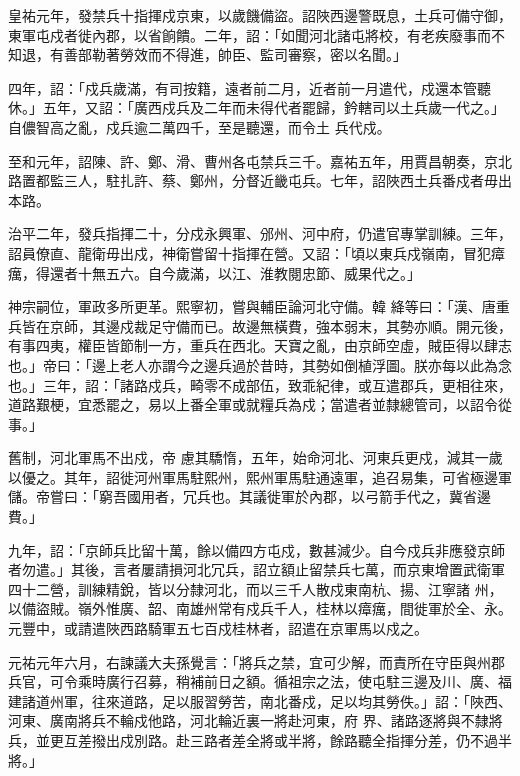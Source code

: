 \begin{pinyinscope}
 皇祐元年，發禁兵十指揮戍京東，以歲饑備盜。詔陜西邊警既息，土兵可備守御，東軍屯戍者徙內郡，以省餉饋。二年，詔：「如聞河北諸屯將校，有老疾廢事而不知退，有善部勒著勞效而不得進，帥臣、監司審察，密以名聞。」



 四年，詔：「戍兵歲滿，有司按籍，遠者前二月，近者前一月遣代，戍還本管聽休。」五年，又詔：「廣西戍兵及二年而未得代者罷歸，鈐轄司以土兵歲一代之。」自儂智高之亂，戍兵逾二萬四千，至是聽還，而令土
 兵代戍。



 至和元年，詔陳、許、鄭、滑、曹州各屯禁兵三千。嘉祐五年，用賈昌朝奏，京北路置都監三人，駐扎許、蔡、鄭州，分督近畿屯兵。七年，詔陜西土兵番戍者毋出本路。



 治平二年，發兵指揮二十，分戍永興軍、邠州、河中府，仍遣官專掌訓練。三年，詔員僚直、龍衛毋出戍，神衛嘗留十指揮在營。又詔：「頃以東兵戍嶺南，冒犯瘴癘，得還者十無五六。自今歲滿，以江、淮教閱忠節、威果代之。」



 神宗嗣位，軍政多所更革。熙寧初，嘗與輔臣論河北守備。韓
 絳等曰：「漢、唐重兵皆在京師，其邊戍裁足守備而已。故邊無橫費，強本弱末，其勢亦順。開元後，有事四夷，權臣皆節制一方，重兵在西北。天寶之亂，由京師空虛，賊臣得以肆志也。」帝曰：「邊上老人亦謂今之邊兵過於昔時，其勢如倒植浮圖。朕亦每以此為念也。」三年，詔：「諸路戍兵，畸零不成部伍，致乖紀律，或互遣郡兵，更相往來，道路艱梗，宜悉罷之，易以上番全軍或就糧兵為戍；當遣者並隸總管司，以詔令從事。」



 舊制，河北軍馬不出戍，帝
 慮其驕惰，五年，始命河北、河東兵更戍，減其一歲以優之。其年，詔徙河州軍馬駐熙州，熙州軍馬駐通遠軍，追召易集，可省極邊軍儲。帝嘗曰：「窮吾國用者，冗兵也。其議徙軍於內郡，以弓箭手代之，冀省邊費。」



 九年，詔：「京師兵比留十萬，餘以備四方屯戍，數甚減少。自今戍兵非應發京師者勿遣。」其後，言者屢請損河北冗兵，詔立額止留禁兵七萬，而京東增置武衛軍四十二營，訓練精銳，皆以分隸河北，而以三千人散戍東南杭、揚、江寧諸
 州，以備盜賊。嶺外惟廣、韶、南雄州常有戍兵千人，桂林以瘴癘，間徙軍於全、永。元豐中，或請遣陜西路騎軍五七百戍桂林者，詔遣在京軍馬以戍之。



 元祐元年六月，右諫議大夫孫覺言：「將兵之禁，宜可少解，而責所在守臣與州郡兵官，可令乘時廣行召募，稍補前日之額。循祖宗之法，使屯駐三邊及川、廣、福建諸道州軍，往來道路，足以服習勞苦，南北番戍，足以均其勞佚。」詔：「陜西、河東、廣南將兵不輪戍他路，河北輪近裏一將赴河東，府
 界、諸路逐將與不隸將兵，並更互差撥出戍別路。赴三路者差全將或半將，餘路聽全指揮分差，仍不過半將。」




\end{pinyinscope}
